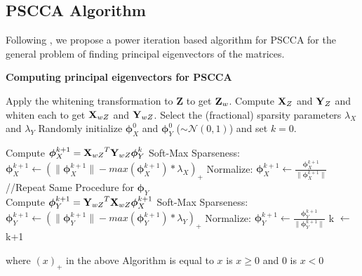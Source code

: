 \documentclass{llncs}
\newcommand{\X}{{\bf X}}
\newcommand{\Y}{{\bf Y}}
\newcommand{\Z}{{\bf Z}}
\newcommand{\bs}{\boldsymbol}
\begin{document}



\subsection{PSCCA Algorithm}
Following \cite{golub}, we propose a power iteration based algorithm for PSCCA for the general problem of finding principal eigenvectors of the matrices.


\begin{algorithm}[htdp]
\small \caption{\bf Computing principal eigenvectors for PSCCA}
\label{partial-mic}
\begin{algorithmic}[1]
\STATE Apply the whitening transformation to {\Z} to get $\Z_{w}$.
\STATE Compute $\X_Z$ and $\Y_Z$ and whiten each to get $\X_{wZ}$ and $\Y_{wZ}$. 
\STATE Select the (fractional) sparsity parameters $\lambda_X$ and $\lambda_Y$
\STATE Randomly initialize $\bs \phi_X^0$ and $\bs \phi_Y^0$ ($\sim \mathcal{N}(0,1)$) and set $k=0$.

\WHILE {$\Delta$ Corr($\bs X_w \bs \phi_X^{k+1}$, $\bs Y_w \bs \phi_Y^{k+1}$) $<$ $\epsilon$}
\STATE Compute  $\bs \phi_X^{k+1}= {\X_{wZ}}^T {\Y_{wZ}} \bs \phi_Y^{k} $ %
\STATE Soft-Max Sparseness:  $\bs \phi_X^{k+1} \leftarrow (\|\bs \phi_X^{k+1}\|  - max(\bs \phi_X^{k+1})*\lambda_X)_+$
\STATE Normalize: $\bs \phi_X^{k+1} \leftarrow \frac{\bs \phi_X^{k+1}}{\|\bs \phi_X^{k+1}\|}$\\
//Repeat Same Procedure for $\bs \phi_Y$ \\
\STATE Compute  $\bs \phi_Y^{k+1}= {\Y_{wZ}}^T {\X_{wZ}} \bs \phi_X^{k+1} $
\STATE Soft-Max Sparseness: $\bs \phi_Y^{k+1} \leftarrow (\|\bs \phi_Y^{k+1}\|  - max(\bs \phi_Y^{k+1})*\lambda_Y)_+$
\STATE Normalize: $\bs \phi_Y^{k+1} \leftarrow \frac{\bs \phi_Y^{k+1}}{\|\bs \phi_Y^{k+1}\|}$
\STATE k $\leftarrow$ k+1
\ENDWHILE
\end{algorithmic}
\end{algorithm}
where $(x)_+$ in the above Algorithm is equal to $x$ is $x \geq 0$ and $0$ is $x <0$
\end{document}
